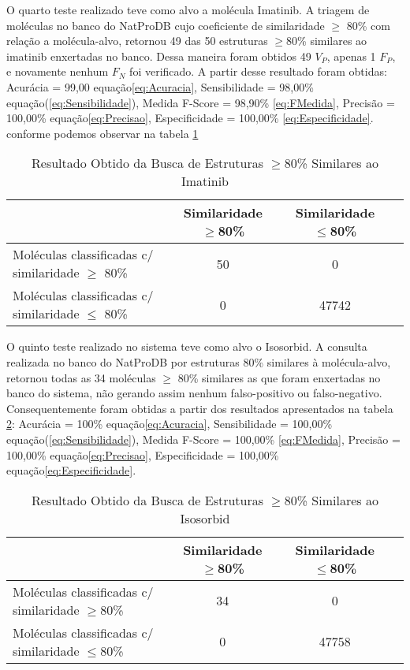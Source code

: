O quarto teste realizado teve como alvo a molécula Imatinib. A triagem de moléculas no banco do NatProDB cujo coeficiente de similaridade $\geq$ 80\% com relação a molécula-alvo, retornou 49 das 50 estruturas $\geq$80\% similares ao imatinib enxertadas no banco. Dessa maneira foram obtidos 49  $V_P$, apenas 1 $F_P$, e novamente nenhum $F_N$ foi verificado. A partir desse resultado foram obtidas: Acurácia = 99,00 equação\eqref{eq:Acuracia}, Sensibilidade = 98,00\% equação(\ref{eq:Sensibilidade}), Medida F-Score = 98,90\% \eqref{eq:FMedida}, Precisão = 100,00\% equação\eqref{eq:Precisao},  Especificidade = 100,00\% \eqref{eq:Especificidade}. conforme podemos observar na tabela \ref{tab:Imatinib}

 \begin{table}[!htb]
	\centering
	\footnotesize
	\caption[Resultado Obtido da Busca de Estruturas $\geq$80\% Similares ao Imatinib]{Resultado Obtido da Busca de Estruturas $\geq$80\% Similares ao Imatinib}
	\label{tab:Imatinib}	
	\begin{tabular}{p{4cm}ccc}
		\hline \SPACE
		\textbf{}&\textbf{Similaridade $\geq$80\%} & \textbf{Similaridade $\leq $80\%} \\ \hline \SPACE
	Moléculas classificadas c/ similaridade $\geq $ 80\%  &	50 & 0 \\ \hline \SPACE
	Moléculas classificadas c/ similaridade $\leq $ 80\%  & 0 & 47742\\ \hline 
	\end{tabular}
\end{table}

O quinto teste realizado no sistema teve como alvo o Isosorbid. A consulta realizada no banco do NatProDB por estruturas 80\% similares à molécula-alvo, retornou todas as 34 moléculas $\geq$ 80\% similares as que foram enxertadas no banco do sistema, não gerando assim nenhum falso-positivo ou falso-negativo. Consequentemente foram obtidas a partir dos resultados apresentados na tabela \ref{tab:Isosorbid}: Acurácia = 100\% equação\eqref{eq:Acuracia}, Sensibilidade = 100,00\% equação(\ref{eq:Sensibilidade}), Medida F-Score = 100,00\% \eqref{eq:FMedida}, Precisão = 100,00\% equação\eqref{eq:Precisao},  Especificidade = 100,00\% equação\eqref{eq:Especificidade}.

 \begin{table}[!htb]
	\centering
	\footnotesize
	\caption[Resultado Obtido da Busca de Estruturas $\geq$80\%  Similares ao Isosorbid]{Resultado Obtido da Busca de Estruturas $\geq$80\% Similares ao Isosorbid}
	\label{tab:Isosorbid}	
	\begin{tabular}{p{4cm}ccc}
		\hline \SPACE
		\textbf{}&\textbf{Similaridade $\geq $80\%} & \textbf{Similaridade $\leq $80\%} \\ \hline \SPACE
	Moléculas classificadas c/ similaridade $\geq $80\%  &	34 & 0 \\ \hline \SPACE
	Moléculas classificadas c/ similaridade $\leq $80\%  & 0 & 47758\\ \hline 
	\end{tabular}
\end{table}

